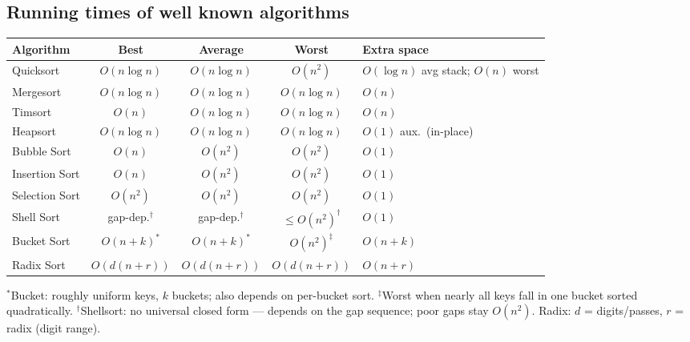 \newpage
\subsection{Running times of well known algorithms}

\begin{table}[H]
    \small
    \begin{tabularx}{\textwidth}{|l|c|c|c|>{\raggedright\arraybackslash}X|}
        \hline
        Algorithm & Best & Average & Worst & Extra space \\
        \hline
        Quicksort & $O(n\log n)$ & $O(n\log n)$ & $O(n^{2})$ &
          $O(\log n)$ avg stack; $O(n)$ worst \\
        \hline
        Mergesort & $O(n\log n)$ & $O(n\log n)$ & $O(n\log n)$ & $O(n)$ \\
        \hline
        Timsort & $O(n)$ & $O(n\log n)$ & $O(n\log n)$ & $O(n)$ \\
        \hline
        Heapsort & $O(n\log n)$ & $O(n\log n)$ & $O(n\log n)$ &
          $O(1)$ aux.\ (in-place) \\
        \hline
        Bubble Sort & $O(n)$ & $O(n^{2})$ & $O(n^{2})$ & $O(1)$ \\
        \hline
        Insertion Sort & $O(n)$ & $O(n^{2})$ & $O(n^{2})$ & $O(1)$ \\
        \hline
        Selection Sort & $O(n^{2})$ & $O(n^{2})$ & $O(n^{2})$ & $O(1)$ \\
        \hline
        Shell Sort & gap-dep.$^{\dagger}$ & gap-dep.$^{\dagger}$ &
          $\le O(n^{2})^{\dagger}$ & $O(1)$ \\
        \hline
        Bucket Sort & $O(n+k)^{\ast}$ & $O(n+k)^{\ast}$ &
          $O(n^{2})^{\ddagger}$ & $O(n+k)$ \\
        \hline
        Radix Sort & $O(d(n+r))$ & $O(d(n+r))$ & $O(d(n+r))$ &
          $O(n+r)$ \\
        \hline
    \end{tabularx}
\end{table}
{\footnotesize
$^{\ast}$Bucket: roughly uniform keys, $k$ buckets; also depends on per-bucket sort.
$^{\ddagger}$Worst when nearly all keys fall in one bucket sorted quadratically.
$^{\dagger}$Shellsort: no universal closed form --- depends on the gap sequence; poor gaps stay $O(n^{2})$.
Radix: $d$ = digits/passes, $r$ = radix (digit range).
}

